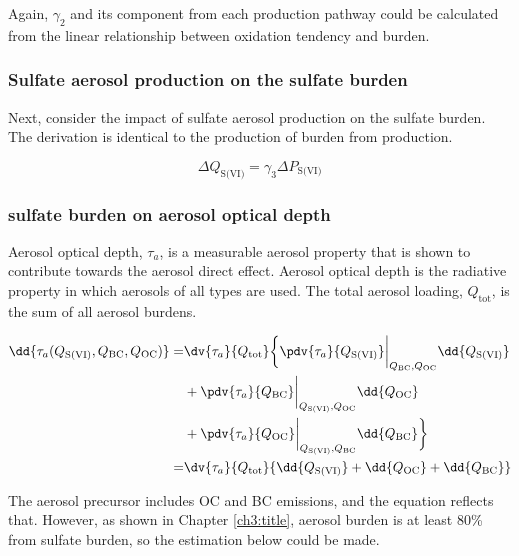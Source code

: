 Again, $\gamma_{2}$ and its component from each production pathway could be calculated from the linear relationship between oxidation tendency and burden. 

\subsubsection*{Sulfate aerosol production on the sulfate burden}

Next, consider the impact of sulfate aerosol production on the sulfate burden. The derivation is identical to the production of  burden from production. 
 
\begin{equation}
    \Delta Q_{\text{S(VI)}} = \gamma_3 \Delta P_{\text{S(VI)}}
\end{equation}

\subsubsection*{sulfate burden on aerosol optical depth}

Aerosol optical depth, $\tau_a$, is a measurable aerosol property that is shown to contribute towards the aerosol direct effect. Aerosol optical depth is the radiative property in which aerosols of all types are used. The total aerosol loading, $Q_{\text{tot}}$, is the sum of all aerosol burdens. 

\begin{equation}
\begin{aligned}
    \dd{\tau_a(Q_{\text{S(VI)}}, Q_{\text{BC}}, Q_{\text{OC}})} =& \dv{\tau_a}{Q_{\text{tot}}} \bigg\{\pdv{\tau_a}{Q_{\text{S(VI)}}}\bigg|_{Q_{\text{BC}},Q_{\text{OC}}}\dd{Q_{\text{S(VI)}}} \\
    & + \pdv{\tau_a}{Q_{\text{BC}}}\bigg|_{Q_{\text{S(VI)}},Q_{\text{OC}}}\dd{Q_{\text{OC}}} \\
    & + \pdv{\tau_a}{Q_{\text{OC}}}\bigg|_{Q_{\text{S(VI)}},Q_{\text{BC}}}\dd{Q_{\text{BC}}}\bigg\} \\
    = & \dv{\tau_a}{Q_{\text{tot}}} \{\dd{Q_{\text{S(VI)}}} + \dd{Q_{\text{OC}}} + \dd{Q_{\text{BC}}}\}
\end{aligned}
\end{equation}

The aerosol precursor includes OC and BC emissions, and the equation reflects that. However, as shown in Chapter \ref{ch3:title}, aerosol burden is at least 80\% from sulfate burden, so the estimation below could be made.

